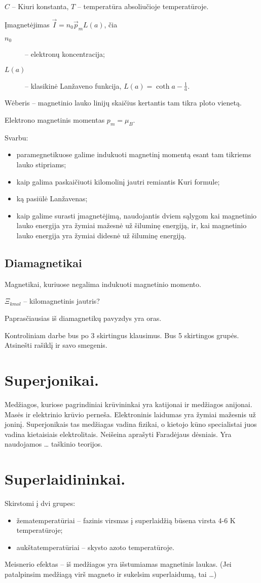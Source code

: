 $C$ – Kiuri konstanta,
$T$ – temperatūra absoliučioje temperatūroje.

Įmagnetėjimas $\vec{I} = n_{0}\vec{p}_{m}L(a)$, čia
\begin{description}
  \item[$n_{0}$] – elektronų koncentracija;
  \item[$L(a)$] – klasikinė Lanžaveno funkcija,
    $L(a) = \coth a - \frac{1}{a}$.
\end{description}

Wėberis – magnetinio lauko linijų skaičius kertantis tam tikra ploto
vienetą.

Elektrono magnetinis momentas $p_{m} = \mu_{B}$.

Svarbu:
\begin{itemize}
  \item paramegnetikuose galime indukuoti magnetinį momentą esant
    tam tikriems lauko stipriams;
  \item kaip galima paskaičiuoti kilomolinį jautri remiantis Kuri
    formule;
  \item ką pasiūlė Lanžavenas;
  \item kaip galime surasti įmagnetėjimą, naudojantis dviem sąlygom
    kai magnetinio lauko energija yra žymiai mažesnė už šiluminę
    energiją, ir, kai magnetinio lauko energija yra žymiai didesnė
    už šiluminę energiją.
\end{itemize}

\subsection{Diamagnetikai}

Magnetikai, kuriuose negalima indukuoti magnetinio momento.

$\Xi_{kmol}$ – kilomagnetinis jautris?

Paprasčiausias iš diamagnetikų pavyzdys yra oras.

Kontroliniam darbe bus po 3 skirtingus klausimus. Bus 5 skirtingos
grupės. Atsinešti rašiklį ir savo smegenis.

\section{Superjonikai.}
Medžiagos, kuriose pagrindiniai krūvininkai yra katijonai ir medžiagos
anijonai. Masės ir elektrinio krūvio perneša. Elektroninis laidumas yra
žymiai mažesnis už joninį. Superjonikais tas medžiagas vadina fizikai,
o kietojo kūno specialistai juos vadina kietaisiais elektrolitais.
Neišeina aprašyti Faradėjaus dėsniais. Yra naudojamos … taškinio teorijos.
\section{Superlaidininkai.}
Skirstomi į dvi grupes:
\begin{itemize}
  \item žematemperatūriai – fazinis virsmas į superlaidžią būsena virsta
    4-6 K temperatūroje;
  \item aukštatemperatūriai – skysto azoto temperatūroje.
\end{itemize}
Meisnerio efektas – iš medžiagos yra išstumiamas magnetinis laukas.
(Jei patalpinsim medžiagą virš magneto ir sukelsim superlaidumą,
tai …)
